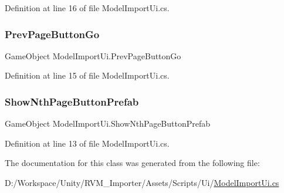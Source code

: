 Definition at line 16 of file Model\+Import\+Ui.\+cs.

\mbox{\label{class_model_import_ui_a7d8183e6375e51d5ac52f0fe5526d95f}} 
\subsubsection{\texorpdfstring{PrevPageButtonGo}{PrevPageButtonGo}}
{\footnotesize\ttfamily Game\+Object Model\+Import\+Ui.\+Prev\+Page\+Button\+Go}



Definition at line 15 of file Model\+Import\+Ui.\+cs.

\mbox{\label{class_model_import_ui_a3b43e2001a2921b62cd56c7eda8881b6}} 
\subsubsection{\texorpdfstring{ShowNthPageButtonPrefab}{ShowNthPageButtonPrefab}}
{\footnotesize\ttfamily Game\+Object Model\+Import\+Ui.\+Show\+Nth\+Page\+Button\+Prefab}



Definition at line 13 of file Model\+Import\+Ui.\+cs.



The documentation for this class was generated from the following file\+:\begin{DoxyCompactItemize}
\item 
D\+:/\+Workspace/\+Unity/\+R\+V\+M\+\_\+\+Importer/\+Assets/\+Scripts/\+Ui/\mbox{\hyperlink{_model_import_ui_8cs}{Model\+Import\+Ui.\+cs}}\end{DoxyCompactItemize}

